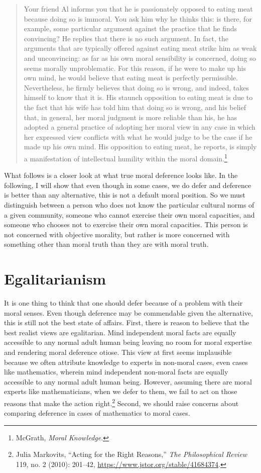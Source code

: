 \documentclass[phdthesis,12pt,final]{wuthesis}
\theoremstyle{definition}
\theoremstyle{definition}
\theoremstyle{definition}
\theoremstyle{definition}
\theoremstyle{remark}
\begin{document}
\begin{quote}
Your friend Al informs you that he is passionately opposed to eating meat because doing so is immoral. You ask him why he thinks this: is there, for example, some particular argument against the practice that he finds convincing? He replies that there is no such argument. In fact, the arguments that are typically offered against eating meat strike him as weak and unconvincing: as far as his own moral sensibility is concerned, doing so seems morally unproblematic. For this reason, if he were to make up his own mind, he would believe that eating meat is perfectly permissible. Nevertheless, he firmly believes that doing so is wrong, and indeed, takes himself to know that it is. His staunch opposition to eating meat is due to the fact that his wife has told him that doing so is wrong, and his belief that, in general, her moral judgment is more reliable than his, he has adopted a general practice of adopting her moral view in any case in which her expressed view conflicts with what he would judge to be the case if he made up his own mind. His opposition to eating meat, he reports, is simply a manifestation of intellectual humility within the moral domain.\footnote{McGrath, \emph{Moral {Knowledge}}.}
\end{quote}

What follows is a closer look at what true moral deference looks like. In the following, I will show that even though in some cases, we do defer and deference is better than any alternative, this is not a default moral position. So we must distinguish between a person who does not know the particular cultural norms of a given community, someone who cannot exercise their own moral capacities, and someone who chooses not to exercise their own moral capacities. This person is not concerned with objective morality, but rather is more concerned with something other than moral truth than they are with moral truth.

\section{Egalitarianism}\label{egalitarianism}

It is one thing to think that one should defer because of a problem with their moral senses. Even though deference may be commendable given the alternative, this is still not the best state of affairs. First, there is reason to believe that the best realist views are egalitarian. Mind independent moral facts are equally accessible to any normal adult human being leaving no room for moral expertise and rendering moral deference otiose. This view at first seems implausible because we often attribute knowledge to experts in non-moral cases, even cases like mathematics, wherein mind independent non-moral facts are equally accessible to any normal adult human being. However, assuming there are moral experts like mathematicians, when we defer to them, we fail to act on those reasons that make the action right.\footnote{Julia Markovits, {``Acting for the {Right Reasons},''} \emph{The Philosophical Review} 119, no. 2 (2010): 201--42, \url{https://www.jstor.org/stable/41684374}.} Second, we should raise concerns about comparing deference in cases of mathematics to moral cases.
\end{document}
